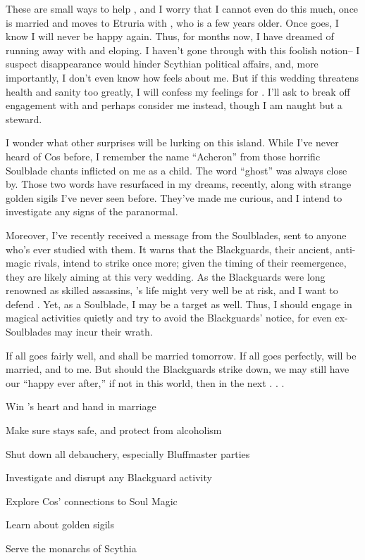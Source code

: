 \documentclass[char]{Kos}
\begin{document}
These are small ways to help \cBride{}, and I worry that I cannot even do this much, once \cBride{\they} is married and moves to Etruria with \cGroom{}, who is a few years older. Once \cBride{\they} goes, I know I will never be happy again. Thus, for months now, I have dreamed of running away with \cBride{} and eloping. I haven't gone through with this foolish notion-- I suspect \cBride{\their} disappearance would hinder Scythian political affairs, and, more importantly, I don't even know how \cBride{} feels about me. But if this wedding threatens \cBride{\their} health and sanity too greatly, I will confess my feelings for \cBride{\them}. I'll ask \cBride{\them} to break off \cBride{\their} engagement with \cGroom{} and perhaps consider me instead, though I am naught but a steward. 

I wonder what other surprises will be lurking on this island. While I've never heard of Cos before, I remember the name ``Acheron'' from those horrific Soulblade chants inflicted on me as a child. The word ``ghost'' was always close by. Those two words have resurfaced in my dreams, recently, along with strange golden sigils I've never seen before. They've made me curious, and I intend to investigate any signs of the paranormal.

Moreover, I've recently received a message from the Soulblades, sent to anyone who's ever studied with them. It warns that the Blackguards, their ancient, anti-magic rivals, intend to strike once more; given the timing of their reemergence, they are likely aiming at this very wedding. As the Blackguards were long renowned as skilled assassins, \cBride{}'s life might very well be at risk, and I want to defend \cBride{\them}. Yet, as a Soulblade, I may be a target as well. Thus, I should engage in magical activities quietly and try to avoid the Blackguards' notice, for even ex-Soulblades may incur their wrath.

If all goes fairly well, \cBride{} and \cGroom{} shall be married tomorrow. If all goes perfectly, \cBride{} will be married, and to me. But should the Blackguards strike \cBride{\them} down, we may still have our ``happy ever after,'' if not in this world, then in the next . . .


\begin{itemz}[Goals]
 \item Win \cBride{}'s heart and \cBride{\their} hand in marriage
 \item Make sure \cBride{} stays safe, and protect \cBride{\them} from alcoholism
 \item Shut down all debauchery, especially Bluffmaster parties
 \item Investigate and disrupt any Blackguard activity
 \item Explore Cos' connections to Soul Magic
 \item Learn about golden sigils
 \item Serve the monarchs of Scythia
\end{itemz}
\end{document}
